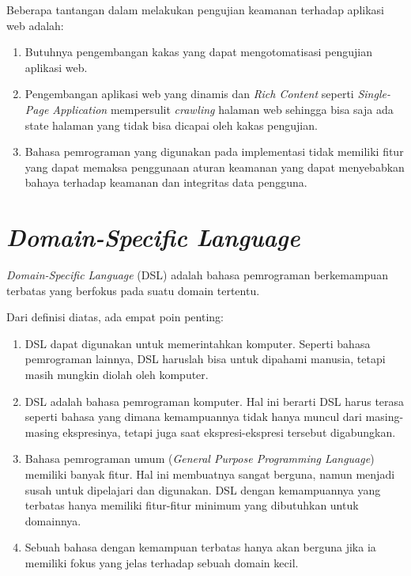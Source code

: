 Beberapa tantangan dalam melakukan pengujian keamanan terhadap aplikasi web adalah:
\begin{enumerate}
    \item Butuhnya pengembangan kakas yang dapat mengotomatisasi pengujian aplikasi web.
    
    \item Pengembangan aplikasi web yang dinamis dan \emph{Rich Content} seperti \emph{Single-Page Application}
    mempersulit \emph{crawling} halaman web sehingga bisa saja ada state halaman yang
    tidak bisa dicapai oleh kakas pengujian.

    \item Bahasa pemrograman yang digunakan pada implementasi tidak memiliki fitur yang
    dapat memaksa penggunaan aturan keamanan yang dapat menyebabkan bahaya terhadap keamanan
    dan integritas data pengguna.
\end{enumerate}

\section{\emph{Domain-Specific Language}}

\emph{Domain-Specific Language} (DSL) adalah bahasa pemrograman berkemampuan terbatas yang
berfokus pada suatu domain tertentu.

Dari definisi diatas, ada empat poin penting:

\begin{enumerate}
    \item DSL dapat digunakan untuk memerintahkan komputer. Seperti bahasa pemrograman lainnya,
    DSL haruslah bisa untuk dipahami manusia, tetapi masih mungkin diolah oleh komputer.

    \item DSL adalah bahasa pemrograman komputer. Hal ini berarti DSL harus terasa seperti
    bahasa yang dimana kemampuannya tidak hanya muncul dari masing-masing ekspresinya,
    tetapi juga saat ekspresi-ekspresi tersebut digabungkan.

    \item Bahasa pemrograman umum (\emph{General Purpose Programming Language}) memiliki banyak fitur.
    Hal ini membuatnya sangat berguna, namun menjadi susah untuk dipelajari dan digunakan.
    DSL dengan kemampuannya yang terbatas hanya memiliki fitur-fitur minimum yang dibutuhkan untuk domainnya.

    \item Sebuah bahasa dengan kemampuan terbatas hanya akan berguna jika ia memiliki
    fokus yang jelas terhadap sebuah domain kecil.
\end{enumerate}

